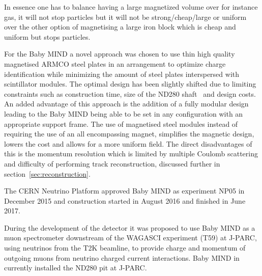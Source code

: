 In essence one has to balance having a large magnetized volume over for instance gas, it will not stop particles but it will not be strong/cheap/large or uniform over the other option of magnetising a large iron block which is cheap and uniform but stops particles.

For the Baby MIND a novel approach was chosen to use thin high quality magnetised ARMCO steel plates in an arrangement to optimize charge identification while minimizing the amount of steel plates interspersed with scintillator modules. The optimal design has been slightly shifted due to limiting constraints such as construction time, size of the ND280 shaft~\cite{21T2K} and design costs. An added advantage of this approach is the addition of a fully modular design leading to the Baby MIND being able to be set in any configuration with an appropriate support frame. The use of magnetised steel modules instead of requiring the use of an all encompassing magnet, simplifies the magnetic design, lowers the cost and allows for a more uniform field. The direct disadvantages of this is the momentum resolution which is limited by multiple Coulomb scattering and difficulty of performing track reconstruction, discussed further in section~\ref{sec:reconstruction}.

The CERN Neutrino Platform approved Baby MIND as experiment NP05 in December 2015 and construction started in August 2016 and finished in June 2017. 

During the development of the detector it was proposed to use Baby MIND as a muon spectrometer downstream of the WAGASCI experiment (T59) at J-PARC, using neutrinos from the T2K beamline, to provide charge and momentum of outgoing muons from neutrino charged current interactions. Baby MIND in currently installed the ND280 pit at J-PARC.





